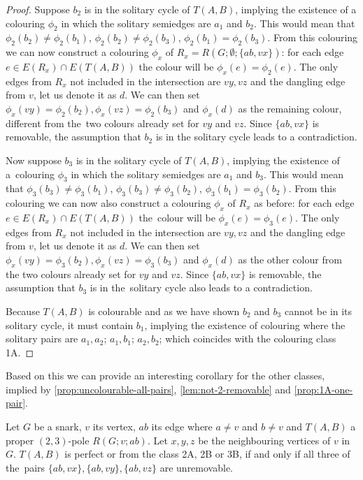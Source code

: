 \begin{proof}
	Suppose $b_2$ is in the solitary cycle of $T(A,B)$, implying the existence of a colouring $\phi_2$ in which the solitary semiedges are $a_1$ and $b_2$. This would mean that $\phi_2(b_2)\neq \phi_2(b_1)$, $\phi_2(b_2)\neq \phi_2(b_3)$, $\phi_2(b_1)= \phi_2(b_3)$. From this colouring we can now construct a colouring $\phi_x$ of $R_x=R(G;\emptyset;\{ab,vx\})$: for each edge $e\in E(R_x)\cap E(T(A,B))$ the colour will be $\phi_x(e)=\phi_2(e)$. The only edges from $R_x$ not included in the intersection are $vy, vz$ and the dangling edge from $v$, let us denote it as $d$. We can then set $\phi_x(vy)=\phi_2(b_2), \phi_x(vz)=\phi_2(b_3)$ and $\phi_x(d)$ as the remaining colour, different from the~two colours already set for $vy$ and $vz$. Since $\{ab,vx\}$ is removable, the assumption that $b_2$ is in the solitary cycle leads to a contradiction.
	
	Now suppose $b_3$ is in the solitary cycle of $T(A,B)$, implying the existence of a~colouring $\phi_3$ in which the solitary semiedges are $a_1$ and $b_3$. This would mean that $\phi_3(b_3)\neq \phi_3(b_1)$, $\phi_3(b_3)\neq \phi_3(b_2)$, $\phi_3(b_1)= \phi_3(b_2)$. From this colouring we can now also construct a colouring $\phi_x$ of $R_x$ as before: for each edge $e\in E(R_x)\cap E(T(A,B))$ the~colour will be $\phi_x(e)=\phi_3(e)$. The only edges from $R_x$ not included in the intersection are $vy, vz$ and the dangling edge from $v$, let us denote it as $d$. We can then set $\phi_x(vy)=\phi_3(b_2), \phi_x(vz)=\phi_3(b_3)$ and $\phi_x(d)$ as the other colour from the two colours already set for $vy$ and $vz$. Since $\{ab,vx\}$ is removable, the assumption that $b_3$ is in the~solitary cycle also leads to a contradiction.
	
	Because $T(A,B)$ is colourable and as we have shown $b_2$ and $b_3$ cannot be in its solitary cycle, it must contain $b_1$, implying the existence of colouring where the solitary pairs are $a_1,a_2$; $a_1,b_1$; $a_2,b_2$; which coincides with the colouring class 1A.
\end{proof}

Based on this we can provide an interesting corollary for the other classes, implied by \cref{prop:uncolourable-all-pairs}, \cref{lem:not-2-removable} and \cref{prop:1A-one-pair}.

\begin{corollary}
	Let $G$ be a snark, $v$ its vertex, $ab$ its edge where $a\neq v$ and $b \neq v$ and $T(A,B)$ a proper $(2,3)$-pole $R(G;v;ab)$. Let $x,y,z$ be the neighbouring vertices of $v$ in $G$. $T(A,B)$ is perfect or from the class 2A, 2B or 3B, if and only if all three of the~pairs $\{ab,vx\}, \{ab,vy\}, \{ab,vz\}$ are unremovable.
	\label{cor:all-3-unremovable}
\end{corollary}

